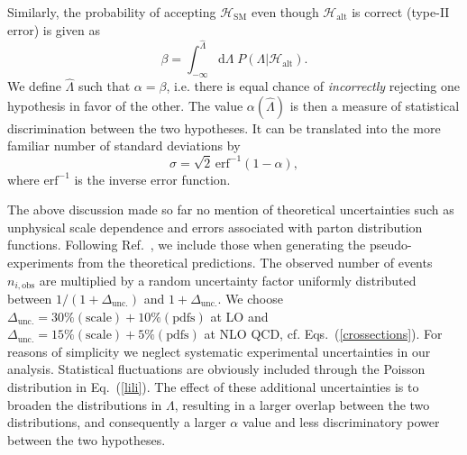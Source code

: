 \documentclass[preprint]{JHEP3} %
\newcommand{\SM}{\mathrm{SM}}
\newcommand{\alt}{\mathrm{alt}}
\def\hLambda {\hat{\Lambda}}
\def\erf{\mathrm{erf}}
\def\Halt{\mathcal{H}_{\mathrm{alt}}}
\begin{document}
Similarly, the probability of accepting $\mathcal{H}_{\SM}$ even though $\mathcal{H}_{\alt}$ is correct (type-II error) is given as 
\begin{equation}
    \beta = \int^{\hLambda}_{-\infty} \mathrm{d}\Lambda \; P(\Lambda|\Halt).
\end{equation}
We define $\hLambda$ such that $\alpha=\beta$, i.e. there is equal chance of {\it incorrectly} rejecting one hypothesis in favor of the other. 
The value $\alpha(\hLambda)$ is then a measure of statistical discrimination between the two hypotheses. 
It can be translated into the more familiar number of standard deviations by 
\begin{equation}
\sigma = \sqrt{2} \, \erf^{-1}(1-\alpha),
\end{equation}
where $\erf^{-1}$ is the inverse error function. 

The above discussion made so far no mention of theoretical uncertainties such as unphysical scale dependence and errors associated with parton distribution functions.
Following Ref.~\cite{Lykken et al}, we include those when generating the pseudo-experiments from the theoretical predictions. 
The observed number of events $n_{i,\mathrm{obs}}$ are multiplied by a random uncertainty factor uniformly distributed 
between $1/(1+\Delta_\mathrm{unc.})$ and $1+\Delta_\mathrm{unc.}$.
We choose $\Delta_\mathrm{unc.} = 30\% (\mathrm{scale}) + 10\%(\mathrm{pdfs})$ at LO
and $\Delta_\mathrm{unc.} = 15\% (\mathrm{scale}) + 5\%(\mathrm{pdfs})$ at NLO QCD, cf. Eqs.~(\ref{crossections}).
For reasons of simplicity we neglect systematic experimental uncertainties in our analysis. 
Statistical fluctuations are obviously included through the Poisson distribution in Eq.~(\ref{lili}).
The effect of these additional uncertainties is to broaden the distributions in $\Lambda$, 
resulting in a larger overlap between the two distributions, and consequently a larger $\alpha$ value and less discriminatory power between the two hypotheses.
\end{document}

